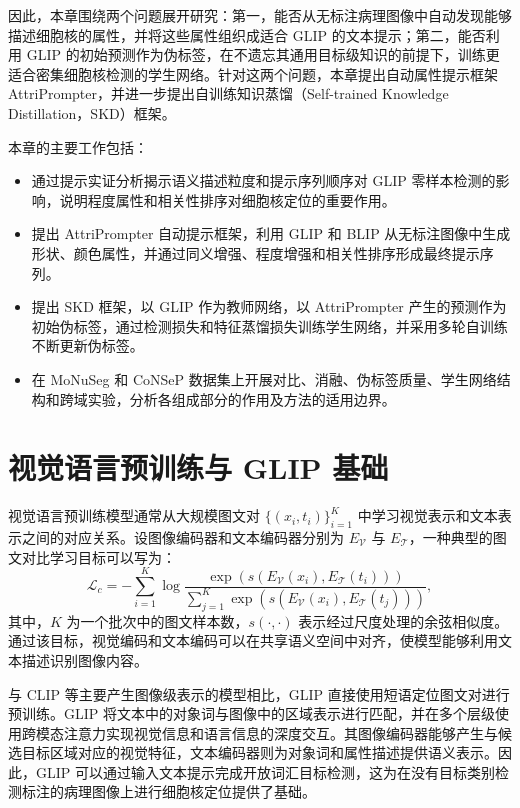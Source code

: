 因此，本章围绕两个问题展开研究：第一，能否从无标注病理图像中自动发现能够描述细胞核的属性，并将这些属性组织成适合 GLIP 的文本提示；第二，能否利用 GLIP 的初始预测作为伪标签，在不遗忘其通用目标级知识的前提下，训练更适合密集细胞核检测的学生网络。针对这两个问题，本章提出自动属性提示框架 AttriPrompter，并进一步提出自训练知识蒸馏（Self-trained Knowledge Distillation，SKD）框架。

本章的主要工作包括：
\begin{itemize}
  \item 通过提示实证分析揭示语义描述粒度和提示序列顺序对 GLIP 零样本检测的影响，说明程度属性和相关性排序对细胞核定位的重要作用。
  \item 提出 AttriPrompter 自动提示框架，利用 GLIP 和 BLIP 从无标注图像中生成形状、颜色属性，并通过同义增强、程度增强和相关性排序形成最终提示序列。
  \item 提出 SKD 框架，以 GLIP 作为教师网络，以 AttriPrompter 产生的预测作为初始伪标签，通过检测损失和特征蒸馏损失训练学生网络，并采用多轮自训练不断更新伪标签。
  \item 在 MoNuSeg 和 CoNSeP 数据集上开展对比、消融、伪标签质量、学生网络结构和跨域实验，分析各组成部分的作用及方法的适用边界。
\end{itemize}

\section{视觉语言预训练与 GLIP 基础}

视觉语言预训练模型通常从大规模图文对 $\{(x_i,t_i)\}_{i=1}^{K}$ 中学习视觉表示和文本表示之间的对应关系。设图像编码器和文本编码器分别为 $E_{\mathcal V}$ 与 $E_{\mathcal T}$，一种典型的图文对比学习目标可以写为：
\begin{equation}
\label{eq:attrip_contrastive}
\mathcal{L}_{c}=-\sum_{i=1}^{K}\log
\frac{\exp\left(s(E_{\mathcal V}(x_i),E_{\mathcal T}(t_i))\right)}
{\sum_{j=1}^{K}\exp\left(s(E_{\mathcal V}(x_i),E_{\mathcal T}(t_j))\right)},
\end{equation}
其中，$K$ 为一个批次中的图文样本数，$s(\cdot,\cdot)$ 表示经过尺度处理的余弦相似度。通过该目标，视觉编码和文本编码可以在共享语义空间中对齐，使模型能够利用文本描述识别图像内容。

与 CLIP 等主要产生图像级表示的模型相比，GLIP 直接使用短语定位图文对进行预训练。GLIP 将文本中的对象词与图像中的区域表示进行匹配，并在多个层级使用跨模态注意力实现视觉信息和语言信息的深度交互。其图像编码器能够产生与候选目标区域对应的视觉特征，文本编码器则为对象词和属性描述提供语义表示。因此，GLIP 可以通过输入文本提示完成开放词汇目标检测，这为在没有目标类别检测标注的病理图像上进行细胞核定位提供了基础。

